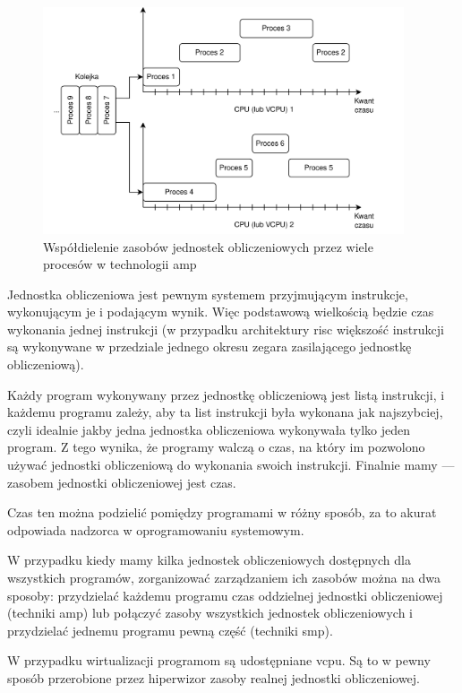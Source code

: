 \documentclass[../main]{subfiles}
\begin{document}
\begin{figure}[h]
    \centering
    \includegraphics[width=0.95\textwidth]{Images/time-sharing.png}
    \caption{Współdielenie zasobów jednostek obliczeniowych przez wiele procesów w technologii \acrshort{amp}}
    \label{fig:time-sharing}
\end{figure}

Jednostka obliczeniowa jest pewnym systemem przyjmującym instrukcje, wykonującym je i podającym wynik. Więc podstawową wielkością będzie czas wykonania jednej instrukcji (w przypadku architektury \acrshort{risc} większość instrukcji są wykonywane w przedziale jednego okresu zegara zasilającego jednostkę obliczeniową).

Każdy program wykonywany przez jednostkę obliczeniową jest listą instrukcji, i każdemu programu zależy, aby ta list instrukcji była wykonana jak najszybciej, czyli idealnie jakby jedna jednostka obliczeniowa wykonywała tylko jeden program. Z tego wynika, że programy walczą o czas, na który im pozwolono używać jednostki obliczeniową do wykonania swoich instrukcji. Finalnie mamy — zasobem jednostki obliczeniowej jest czas.

Czas ten można podzielić pomiędzy programami w różny sposób, za to akurat odpowiada nadzorca w oprogramowaniu systemowym.

W przypadku kiedy mamy kilka jednostek obliczeniowych dostępnych dla wszystkich programów, zorganizować zarządzaniem ich zasobów można na dwa sposoby: przydzielać każdemu programu czas oddzielnej jednostki obliczeniowej (techniki \acrshort{amp}) lub połączyć zasoby wszystkich jednostek obliczeniowych i przydzielać jednemu programu pewną część (techniki \acrshort{smp}).

W przypadku wirtualizacji programom są udostępniane \acrshort{vcpu}. Są to w pewny sposób przerobione przez hiperwizor zasoby realnej jednostki obliczeniowej.
\end{document}
